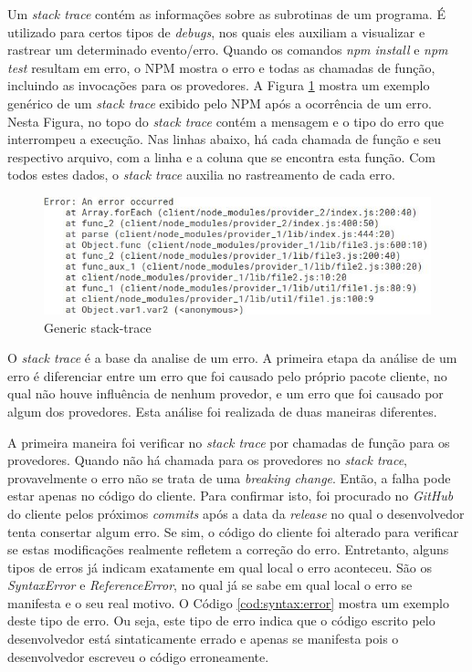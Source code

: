 Um \textit{stack trace} contém as informações sobre as subrotinas de um programa. É utilizado para certos tipos de \textit{debugs}, nos quais eles auxiliam a visualizar e rastrear um determinado evento/erro. Quando os comandos \textit{npm install} e \textit{npm test} resultam em erro, o \Gls{NPM} mostra o erro e todas as chamadas de função, incluindo as invocações para os provedores. A Figura \ref{fig:trace} mostra um exemplo genérico de um \textit{stack trace} exibido pelo \Gls{NPM} após a ocorrência de um erro. Nesta Figura, no topo do \textit{stack trace} contém a mensagem e o tipo do erro que interrompeu a execução. Nas linhas abaixo, há cada chamada de função e seu respectivo arquivo, com a linha e a coluna que se encontra esta função. Com todos estes dados, o \textit{stack trace} auxilia no rastreamento de cada erro.

\begin{figure}
    \centering
    \includegraphics[scale=0.7]{figuras/stack_trace.jpeg}
    \caption{Generic stack-trace}
    \label{fig:trace}
\end{figure}{}

O \textit{stack trace} é a base da analise de um erro. A primeira etapa da análise de um erro é diferenciar entre um erro que foi causado pelo próprio pacote cliente, no qual não houve influência de nenhum provedor, e um erro que foi causado por algum dos provedores. Esta análise foi realizada de duas maneiras diferentes.

A primeira maneira foi verificar no \textit{stack trace} por chamadas de função para os provedores. Quando não há chamada para os provedores no \textit{stack trace}, provavelmente o erro não se trata de uma \textit{breaking change}. Então, a falha pode estar apenas no código do cliente. Para confirmar isto, foi procurado no \textit{GitHub} do cliente pelos próximos \textit{commits} após a data da \textit{release} no qual o desenvolvedor tenta consertar algum erro. Se sim, o código do cliente foi alterado para verificar se estas modificações realmente refletem a correção do erro. Entretanto, alguns tipos de erros já indicam exatamente em qual local o erro aconteceu. São os \textit{SyntaxError} e \textit{ReferenceError}, no qual já se sabe em qual local o erro se manifesta e o seu real motivo. O Código \ref{cod:syntax:error} mostra um exemplo deste tipo de erro. Ou seja, este tipo de erro indica que o código escrito pelo desenvolvedor está sintaticamente errado e apenas se manifesta pois o desenvolvedor escreveu o código erroneamente.

